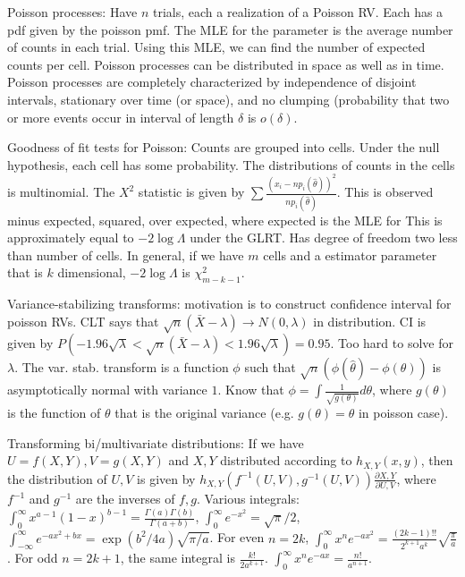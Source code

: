 \documentclass{article}
\begin{document}
Poisson processes: Have $n$ trials, each a realization of a Poisson RV. Each has a pdf given by the poisson pmf. The MLE for the parameter is the average number of counts in each trial. Using this MLE, we can find the number of expected counts per cell. Poisson processes can be distributed in space as well as in time. Poisson processes are completely characterized by independence of disjoint intervals, stationary over time (or space), and no clumping (probability that two or more events occur in interval of length $\delta$ is $o(\delta)$.

Goodness of fit tests for Poisson: Counts are grouped into cells. Under the null hypothesis, each cell has some probability. The distributions of counts in the cells is multinomial. The $X^2$ statistic is given by $\sum\frac{(x_i-np_i(\hat{\theta}))^2}{np_i(\hat{\theta})}$. This is observed minus expected, squared, over expected, where expected is the MLE for  This is approximately equal to $-2\log\Lambda$ under the GLRT. Has degree of freedom two less than number of cells. In general, if we have $m$ cells and a estimator parameter that is $k$ dimensional, $-2\log\Lambda$ is $\chi^2_{m-k-1}$. 

Variance-stabilizing transforms: motivation is to construct confidence interval for poisson RVs. CLT says that $\sqrt{n}(\bar{X}-\lambda)\to N(0,\lambda)$ in distribution. CI is given by $P(-1.96\sqrt{\lambda}<\sqrt{n}(\bar{X}-\lambda)<1.96\sqrt{\lambda})=0.95$. Too hard to solve for $\lambda$. The var. stab. transform is a function $\phi$ such that $\sqrt{n}(\phi(\hat{\theta})-\phi(\theta))$ is asymptotically normal with variance $1$. Know that $\phi=\int\frac{1}{\sqrt{g(\theta)}}d\theta$, where $g(\theta)$ is the function of $\theta$ that is the original variance (e.g. $g(\theta)=\theta$ in poisson case).

Transforming bi/multivariate distributions: If we have $U=f(X,Y),V=g(X,Y)$ and $X,Y$ distributed according to $h_{X,Y}(x,y)$, then the distribution of $U,V$ is given by $h_{X,Y}(f^{-1}(U,V),g^{-1}(U,V))\frac{\partial X,Y}{\partial U,V}$, where $f^{-1}$ and $g^{-1}$ are the inverses of $f,g$. 
Various integrals: $\int_0^\infty x^{a-1}(1-x)^{b-1}=\frac{\Gamma(a)\Gamma(b)}{\Gamma(a+b)}$, $\int_0^\infty e^{-x^2}=\sqrt{\pi}/2$, $\int_{-\infty}^\infty e^{-ax^2+bx}=\exp(b^2/4a)\sqrt{\pi/a}$. For even $n=2k$, $\int_0^\infty x^ne^{-ax^2}=\frac{(2k-1)!!}{2^{k+1}a^k}\sqrt{\frac{\pi}{a}}$. For odd $n=2k+1$, the same integral is $\frac{k!}{2a^{k+1}}$. $\int_0^\infty x^ne^{-ax}=\frac{n!}{a^{n+1}}$. 
\end{document}
